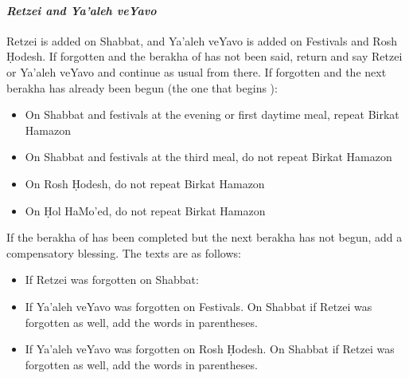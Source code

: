 \paragraph{\textit{Retzei and Ya'aleh veYavo}} Retzei is added on Shabbat, and Ya'aleh veYavo is added on Festivals and Rosh \d{H}odesh.  If forgotten and the berakha of  has not been said, return and say Retzei or Ya'aleh veYavo and continue as usual from there.  If forgotten and the next berakha has already been begun (the one that begins ): \begin{itemize}
	\item On Shabbat and festivals at the evening or first daytime meal, repeat Birkat Hamazon
	\item On Shabbat and festivals at the third meal, do not repeat Birkat Hamazon
	\item On Rosh \d{H}odesh, do not repeat Birkat Hamazon
	\item On \d{H}ol HaMo'ed, do not repeat Birkat Hamazon
\end{itemize}

If the berakha of  has been completed but the next berakha has not begun, add a compensatory blessing.  The texts are as follows:


\begin{itemize}
	\item If Retzei was forgotten on Shabbat:\\
	\item If Ya'aleh veYavo was forgotten on Festivals. On Shabbat if Retzei was forgotten as well, add the words in parentheses.\\
	\item If Ya'aleh veYavo was forgotten on Rosh \d{H}odesh.  On Shabbat if Retzei was forgotten as well, add the words in parentheses. \\
\end{itemize}

